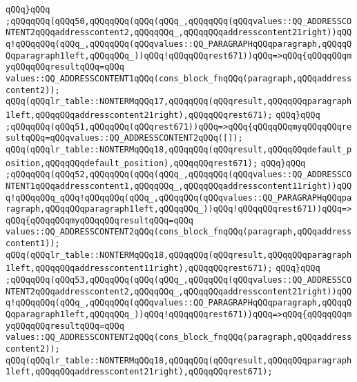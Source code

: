 \verb|qQQq}qQQq|\newline
\verb|;qQQqqQQq(qQQq50,qQQqqQQq(qQQq(qQQq_,qQQqqQQq(qQQqvalues::QQ_ADDRESSCONTENT2qQQqaddresscontent2,qQQqqQQq_,qQQqqQQqaddresscontent21right))qQQq!qQQqqQQq(qQQq_,qQQqqQQq(qQQqvalues::QQ_PARAGRAPHqQQqparagraph,qQQqqQQqparagraph1left,qQQqqQQq_))qQQq!qQQqqQQqrest671))qQQq=>qQQq{qQQqqQQqmyqQQqqQQqresultqQQq=qQQq|\newline
\verb|values::QQ_ADDRESSCONTENT1qQQq(cons_block_fnqQQq(paragraph,qQQqaddresscontent2));|\newline
\verb|qQQq(qQQqlr_table::NONTERMqQQq17,qQQqqQQq(qQQqresult,qQQqqQQqparagraph1left,qQQqqQQqaddresscontent21right),qQQqqQQqrest671);|\newline
\verb|qQQq}qQQq|\newline
\verb|;qQQqqQQq(qQQq51,qQQqqQQq(qQQqrest671))qQQq=>qQQq{qQQqqQQqmyqQQqqQQqresultqQQq=qQQqvalues::QQ_ADDRESSCONTENT2qQQq([]);|\newline
\verb|qQQq(qQQqlr_table::NONTERMqQQq18,qQQqqQQq(qQQqresult,qQQqqQQqdefault_position,qQQqqQQqdefault_position),qQQqqQQqrest671);|\newline
\verb|qQQq}qQQq|\newline
\verb|;qQQqqQQq(qQQq52,qQQqqQQq(qQQq(qQQq_,qQQqqQQq(qQQqvalues::QQ_ADDRESSCONTENT1qQQqaddresscontent1,qQQqqQQq_,qQQqqQQqaddresscontent11right))qQQq!qQQqqQQq_qQQq!qQQqqQQq(qQQq_,qQQqqQQq(qQQqvalues::QQ_PARAGRAPHqQQqparagraph,qQQqqQQqparagraph1left,qQQqqQQq_))qQQq!qQQqqQQqrest671))qQQq=>qQQq{qQQqqQQqmyqQQqqQQqresultqQQq=qQQq|\newline
\verb|values::QQ_ADDRESSCONTENT2qQQq(cons_block_fnqQQq(paragraph,qQQqaddresscontent1));|\newline
\verb|qQQq(qQQqlr_table::NONTERMqQQq18,qQQqqQQq(qQQqresult,qQQqqQQqparagraph1left,qQQqqQQqaddresscontent11right),qQQqqQQqrest671);|\newline
\verb|qQQq}qQQq|\newline
\verb|;qQQqqQQq(qQQq53,qQQqqQQq(qQQq(qQQq_,qQQqqQQq(qQQqvalues::QQ_ADDRESSCONTENT2qQQqaddresscontent2,qQQqqQQq_,qQQqqQQqaddresscontent21right))qQQq!qQQqqQQq(qQQq_,qQQqqQQq(qQQqvalues::QQ_PARAGRAPHqQQqparagraph,qQQqqQQqparagraph1left,qQQqqQQq_))qQQq!qQQqqQQqrest671))qQQq=>qQQq{qQQqqQQqmyqQQqqQQqresultqQQq=qQQq|\newline
\verb|values::QQ_ADDRESSCONTENT2qQQq(cons_block_fnqQQq(paragraph,qQQqaddresscontent2));|\newline
\verb|qQQq(qQQqlr_table::NONTERMqQQq18,qQQqqQQq(qQQqresult,qQQqqQQqparagraph1left,qQQqqQQqaddresscontent21right),qQQqqQQqrest671);|\newline
